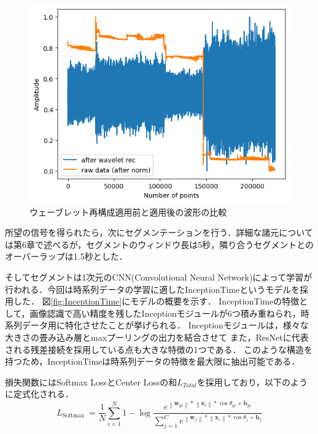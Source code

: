 \begin{figure}[H]
\begin{center}
\includegraphics[width=\linewidth]{./fig/comparison_raw_wavelet_ID01.png}
\end{center}
\caption{ウェーブレット再構成適用前と適用後の波形の比較}
\label{fig:wave}
\end{figure}

所望の信号を得られたら，次にセグメンテーションを行う．詳細な諸元については第6章で述べるが，セグメントのウィンドウ長は5秒，隣り合うセグメントとのオーバーラップは1.5秒とした．

そしてセグメントは1次元のCNN(Convolutional Neural Network)によって学習が行われる．今回は時系列データの学習に適したInceptionTime\cite{paper:InceptionTime}というモデルを採用した．
図\ref{fig:InceptionTime}にモデルの概要を示す．
InceptionTimeの特徴として，画像認識で高い精度を残したInceptionモジュール\cite{paper:Inception}が6つ積み重ねられ，時系列データ用に特化させたことが挙げられる．
Inceptionモジュールは，様々な大きさの畳み込み層とmaxプーリングの出力を結合させて
また，ResNet\cite{paper:ResNet}に代表される残差接続を採用している点も大きな特徴の1つである．
このような構造を持つため，InceptionTimeは時系列データの特徴を最大限に抽出可能である．

損失関数にはSoftmax LossとCenter Lossの和$L_{Total}$を採用しており，以下のように定式化される\cite{paper:centerloss}．
\begin{equation}{L_{{\text{Softmax }}}} = \frac{1}{N}\sum\limits_{i = 1}^N 1 - \log \frac{{{e^{\left\| {{{\mathbf{w}}_{yi}}} \right\|*\left\| {{{\mathbf{x}}_i}} \right\|*\cos {\theta _{yi}} + {{\mathbf{b}}_{yi}}}}}}{{\sum\limits_{j = 1}^C {{e^{\left\| {{{\mathbf{w}}_j}} \right\|*\left\| {{{\mathbf{x}}_i}} \right\|*\cos {\theta _j} + {{\mathbf{b}}_j}}}} }}\tag{1}\end{equation}

